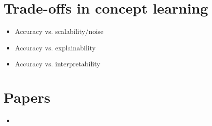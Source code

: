 \section{Trade-offs in concept learning}
\begin{itemize}
    \item Accuracy vs. scalability/noise
    \item Accuracy vs. explainability
    \item Accuracy vs. interpretability
\end{itemize}


\section*{Papers}
\nobibliography*
\begin{itemize}
    \item {}
\end{itemize}
